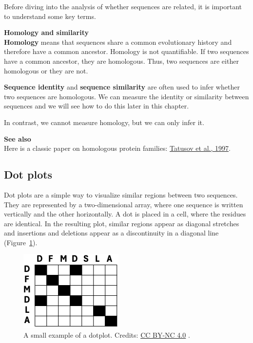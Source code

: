 Before diving into the analysis of whether sequences are related, it is important to understand some key terms.

\begin{framed}
\textbf{Homology and similarity}\\
\textbf{Homology} means that sequences share a common evolutionary history and therefore have a common ancestor.
Homology is not quantifiable.
If two sequences have a common ancestor, they are homologous.
Thus, two sequences are either homologous or they are not.

\textbf{Sequence identity} and \textbf{sequence similarity} are often used to infer whether two sequences are homologous.
We can measure the identity or similarity between sequences and we will see how to do this later in this chapter.

In contrast, we cannot measure homology, but we can only infer it.
\end{framed}

\begin{framed}
\textbf{See also}\\
Here is a classic paper on homologous protein families: \href{https://pubmed.ncbi.nlm.nih.gov/9381173/}{Tatusov et al., 1997}.
\end{framed}

\subsection{Dot plots}

Dot plots are a simple way to visualize similar regions between two sequences.
They are represented by a two-dimensional array, where one sequence is written vertically and the other horizontally.
A dot is placed in a cell, where the residues are identical.
In the resulting plot, similar regions appear as diagonal stretches and insertions and deletions appear as a discontinuity in a diagonal line (Figure~\ref{dotsmall}).

\begin{figure}[!htbp]
\centering
\includegraphics[width=0.9\linewidth]{files/dot_small2-db4f4d0b90fecfbd44f5897dc049fa70.png}
\caption[]{A small example of a dotplot. \newline
Credits: \href{https://creativecommons.org/licenses/by-nc/4.0/}{CC BY-NC 4.0} \cite{own_2_2024}.}
\label{dotsmall}
\end{figure}

